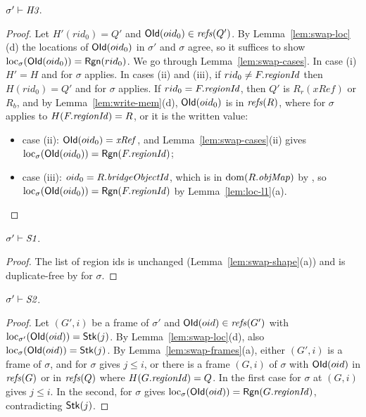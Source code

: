 \begin{lemma}[\inv{H3}] 
$\sigma' \vdash \textit{H3}$.
\end{lemma}
\begin{proof}
Let $H'(rid_0) = Q'$ and $\mathsf{OId}(oid_0) \in \mathit{refs}(Q')$. By Lemma~\ref{lem:swap-loc}(d) the locations
of $\mathsf{OId}(oid_0)$ in $\sigma'$ and $\sigma$ agree, so it suffices to show
$\mathrm{loc}_{\sigma}(\mathsf{OId}(oid_0)) = \mathsf{Rgn}(rid_0)$. We go through Lemma~\ref{lem:swap-cases}. In case (i)
$H' = H$ and  for $\sigma$ applies. In cases (ii) and (iii), if $rid_0 \ne F.\mathit{regionId}$ then
$H(rid_0) = Q'$ and  for $\sigma$ applies. If $rid_0 = F.\mathit{regionId}$, then $Q'$ is
$R_r(\mathit{xRef})$ or $R_b$, and by Lemma~\ref{lem:write-mem}(d), $\mathsf{OId}(oid_0)$ is in $\mathit{refs}(R)$,
where  for $\sigma$ applies to $H(F.\mathit{regionId}) = R$, or it is the written value:
\begin{itemize}[nosep]
  \item case (ii): $\mathsf{OId}(oid_0) = \mathit{xRef}$, and Lemma~\ref{lem:swap-cases}(ii) gives
    $\mathrm{loc}_{\sigma}(\mathsf{OId}(oid_0)) = \mathsf{Rgn}(F.\mathit{regionId})$;
  \item case (iii): $oid_0 = R.\mathit{bridgeObjectId}$, which is in $\mathrm{dom}(R.\mathit{objMap})$ by , so
    $\mathrm{loc}_{\sigma}(\mathsf{OId}(oid_0)) = \mathsf{Rgn}(F.\mathit{regionId})$ by Lemma~\ref{lem:loc-l1}(a). \qedhere
\end{itemize}
\end{proof}

\begin{lemma}[\inv{S1}] 
$\sigma' \vdash \textit{S1}$.
\end{lemma}
\begin{proof}
The list of region ids is unchanged (Lemma~\ref{lem:swap-shape}(a)) and is duplicate-free by 
for $\sigma$.
\end{proof}

\begin{lemma}[\inv{S2}] 
$\sigma' \vdash \textit{S2}$.
\end{lemma}
\begin{proof}
Let $(G', i)$ be a frame of $\sigma'$ and $\mathsf{OId}(oid) \in \mathit{refs}(G')$ with
$\mathrm{loc}_{\sigma'}(\mathsf{OId}(oid)) = \mathsf{Stk}(j)$. By Lemma~\ref{lem:swap-loc}(d), also
$\mathrm{loc}_{\sigma}(\mathsf{OId}(oid)) = \mathsf{Stk}(j)$. By Lemma~\ref{lem:swap-frames}(a), either $(G', i)$ is a frame
of $\sigma$, and  for $\sigma$ gives $j \le i$, or there is a frame $(G, i)$ of $\sigma$ with
$\mathsf{OId}(oid)$ in $\mathit{refs}(G)$ or in $\mathit{refs}(Q)$ where $H(G.\mathit{regionId}) = Q$. In the first case  for
$\sigma$ at $(G, i)$ gives $j \le i$. In the second,  for $\sigma$ gives
$\mathrm{loc}_{\sigma}(\mathsf{OId}(oid)) = \mathsf{Rgn}(G.\mathit{regionId})$, contradicting $\mathsf{Stk}(j)$.
\end{proof}

